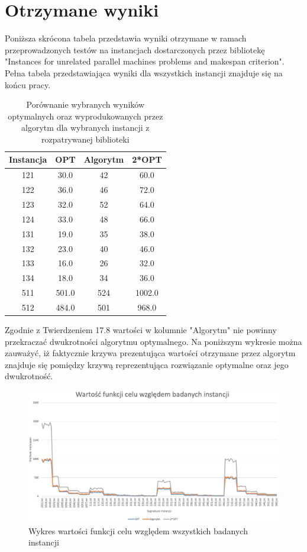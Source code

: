 \documentclass[12pt, a4paper]{report}
\begin{document}
\chapter{Otrzymane wyniki}
  Poniższa skrócona tabela przedstawia wyniki otrzymane w ramach przeprowadzonych testów na instancjach dostarczonych 
  przez bibliotekę "Instances for unrelated parallel machines problems and makespan criterion". Pełna tabela 
  przedstawiająca wyniki dla wszystkich instancji znajduje się na końcu pracy.
  \begin{table}[H]
    \centering
    \begin{tabular}{|c | c | c | c |} 
    \hline
    Instancja & OPT & Algorytm & 2*OPT\\
    \hline
    121 & 30.0 & 42 & 60.0 \\
    122 & 36.0 & 46 & 72.0 \\
    123 & 32.0 & 52 & 64.0 \\
    124 & 33.0 & 48 & 66.0 \\
    131 & 19.0 & 35 & 38.0 \\
    132 & 23.0 & 40 & 46.0 \\
    133 & 16.0 & 26 & 32.0 \\
    134 & 18.0 & 34 & 36.0 \\
    511 & 501.0 & 524 & 1002.0 \\
    512 & 484.0 & 501 & 968.0 \\
    \hline
    \end{tabular}
    \caption{Porównanie wybranych wyników optymalnych oraz wyprodukowanych przez algorytm dla wybranych instancji z rozpatrywanej biblioteki}
\end{table}
  Zgodnie z Twierdzeniem 17.8 \cite{Alg} wartości w kolumnie "Algorytm" nie powinny przekraczać dwukrotności algorytmu optymalnego. Na poniższym wykresie
  można zauważyć, iż faktycznie krzywa prezentująca wartości otrzymane przez algorytm znajduje się pomiędzy krzywą reprezentująca rozwiązanie optymalne oraz jego dwukrotność.
  \begin{figure}[H]
    \includegraphics[scale=0.5]{1}
    \centering
    \caption{Wykres wartości funkcji celu względem wszystkich badanych instancji}
  \end{figure}
\end{document}
